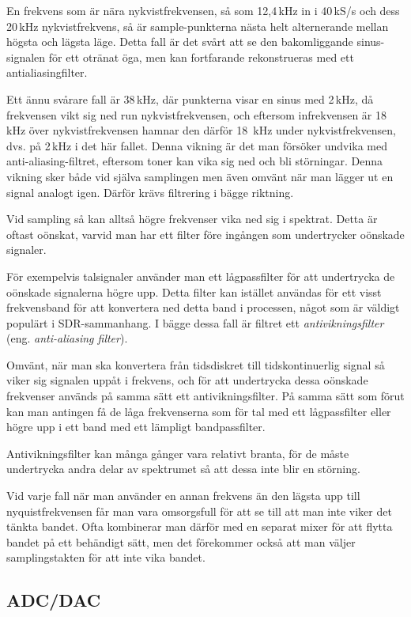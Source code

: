 En frekvens som är nära nykvistfrekvensen, så som 12,4\,kHz in i 40\,kS/s och
dess 20\,kHz nykvistfrekvens, så är sample-punkterna nästa helt alternerande
mellan högsta och lägsta läge. Detta fall är det svårt att se den bakomliggande
sinus-signalen för ett otränat öga, men kan fortfarande rekonstrueras med ett
antialiasingfilter.

Ett ännu svårare fall är 38\,kHz, där punkterna visar en sinus med 2\,kHz, då
frekvensen vikt sig ned run nykvistfrekvensen, och eftersom infrekvensen är
18\,kHz över nykvistfrekvensen hamnar den därför 18~kHz under nykvistfrekvensen,
dvs. på 2\,kHz i det här fallet. Denna vikning är det man försöker undvika med
anti-aliasing-filtret, eftersom toner kan vika sig ned och bli störningar.
Denna vikning sker både vid själva samplingen men även omvänt när man lägger ut
en signal analogt igen. Därför krävs filtrering i bägge riktning.

Vid sampling så kan alltså högre frekvenser vika ned sig i spektrat.
Detta är oftast oönskat, varvid man har ett filter före ingången som
undertrycker oönskade signaler.

För exempelvis talsignaler använder man ett lågpassfilter för att undertrycka de
oönskade signalerna högre upp.
Detta filter kan istället användas för ett visst frekvensband för att
konvertera ned detta band i processen, något som är väldigt populärt i
SDR-sammanhang.
I bägge dessa fall är filtret ett \emph{antivikningsfilter} (eng.
\emph{anti-aliasing filter}).

Omvänt, när man ska konvertera från tidsdiskret till tidskontinuerlig
signal så viker sig signalen uppåt i frekvens, och för att undertrycka dessa
oönskade frekvenser används på samma sätt ett antivikningsfilter.
På samma sätt som förut kan man antingen få de låga frekvenserna som för tal
med ett lågpassfilter eller högre upp i ett band med ett lämpligt
bandpassfilter.

Antivikningsfilter kan många gånger vara relativt branta, för de måste
undertrycka andra delar av spektrumet så att dessa inte blir en störning.

Vid varje fall när man använder en annan frekvens än den lägsta upp till
nyquistfrekvensen får man vara omsorgsfull för att se till att man inte viker
det tänkta bandet.
Ofta kombinerar man därför med en separat mixer för att flytta bandet på ett
behändigt sätt, men det förekommer också att man väljer samplingstakten för att
inte vika bandet.

\subsection{ADC/DAC}

